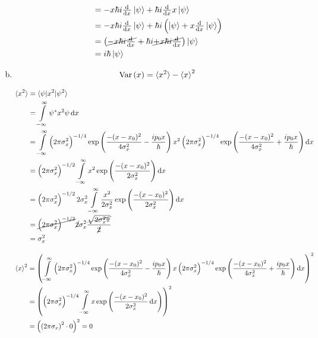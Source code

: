 \documentclass[a4paper,german,12pt,smallheadings]{scrartcl}
\DeclareMathOperator{\Var}{Var}
\begin{document}
\begin{enumerate}[a)]
\begin{align*}
                          &= -x \hbar i \od{}{x} \ket{\psi} + \hbar i \od{}{x} x \ket{\psi} \\
                          &= -x \hbar i \od{}{x} \ket{\psi} + \hbar i \del{\ket{\psi} + x \od{}{x}\ket{\psi}} \\
                          &= \del{\cancel{-x \hbar i \od{}{x}} + \hbar i \cancel{+ x \hbar i \od{}{x}}} \ket{\psi} \\
                          &= i \hbar \ket{\psi}
    \end{align*}
  \item
    \begin{align*}
      \Var\del{x} = \braket{x^2} - \braket{x}^2
    \end{align*}

    \begin{align*}
      \braket{x^2} &= \braket{\psi|x^2|\psi^2} \\
                   &= \int\limits_{-\infty}^{\infty} \psi^* x^2 \psi \dif x \\
                   &= \int\limits_{-\infty}^\infty
      \del{2 \pi \sigma_x^2}^{-1/4} \exp\del{\frac{-(x-x_0)^2}{4 \sigma_x^2} - \frac{ip_0x}{\hbar}}
      x^2
      \del{2 \pi \sigma_x^2}^{-1/4} \exp\del{\frac{-(x-x_0)^2}{4 \sigma_x^2} + \frac{ip_0x}{\hbar}}
      \dif x \\
                   &=
      \del{2 \pi \sigma_x^2}^{-1/2}
      \int\limits_{-\infty}^\infty x^2 \exp\del{\frac{-(x-x_0)^2}{2 \sigma_x^2}} \dif x \\
      &= \del{2 \pi \sigma_x^2}^{-1/2} 2 \sigma_x^2
      \int\limits_{-\infty}^\infty \frac{x^2}{2 \sigma_x^2} \exp\del{\frac{-(x-x_0)^2}{2 \sigma_x^2}} \dif x \\
      &= \cancel{\del{2 \pi \sigma_x^2}^{-1/2}} \cancel{2} \sigma_x^2 \frac{\cancel{\sqrt{2 \sigma_x^2 \pi}}}{\cancel{2}} \\
      &= \sigma_x^2
    \end{align*}

    \begin{align*}
      \braket{x}^2 &= 
      \del{\int\limits_{-\infty}^\infty
      \del{2 \pi \sigma_x^2}^{-1/4} \exp\del{\frac{-(x-x_0)^2}{4 \sigma_x^2} - \frac{ip_0x}{\hbar}}
      x
      \del{2 \pi \sigma_x^2}^{-1/4} \exp\del{\frac{-(x-x_0)^2}{4 \sigma_x^2} + \frac{ip_0x}{\hbar}}
      \dif x}^2 \\
      &= \del{\del{2 \pi \sigma_x^2}^{-1/4} \int\limits_{-\infty}^\infty x \exp\del{\frac{-(x-x_0)^2}{2\sigma_x^2} \dif x}}^2 \\
      &= \del{\del{2 \pi \sigma_x}^2 \cdot 0}^2 = 0
    \end{align*}


\end{enumerate}
\end{document}
